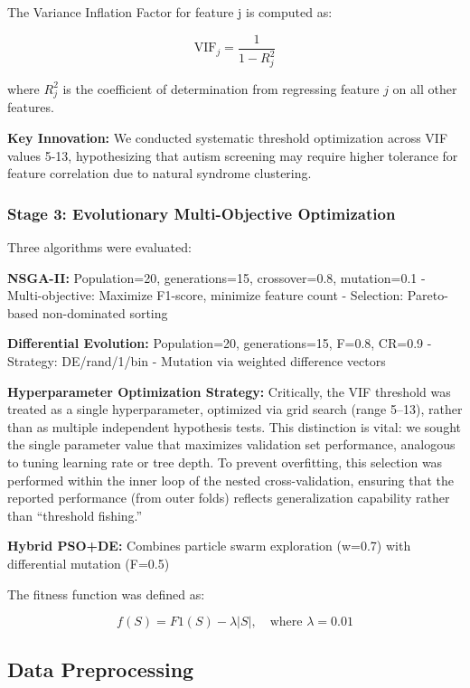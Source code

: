 The Variance Inflation Factor for feature j is computed as:

\[
\mathrm{VIF}_j = \frac{1}{1 - R_j^2}
\]

where \(R_j^2\) is the coefficient of determination from regressing feature \(j\) on all other features.

\textbf{Key Innovation:} We conducted systematic threshold optimization across VIF values 5-13, hypothesizing that autism screening may require higher tolerance for feature correlation due to natural syndrome clustering.

\subsubsection{Stage 3: Evolutionary Multi-Objective Optimization}\label{stage-3-evolutionary-multi-objective-optimization}

Three algorithms were evaluated:

\textbf{NSGA-II:} Population=20, generations=15, crossover=0.8, mutation=0.1 - Multi-objective: Maximize F1-score, minimize feature count - Selection: Pareto-based non-dominated sorting

\textbf{Differential Evolution:} Population=20, generations=15, F=0.8, CR=0.9 - Strategy: DE/rand/1/bin - Mutation via weighted difference vectors

\textbf{Hyperparameter Optimization Strategy:} Critically, the VIF threshold was treated as a single hyperparameter, optimized via grid search (range 5--13), rather than as multiple independent hypothesis tests. This distinction is vital: we sought the single parameter value that maximizes validation set performance, analogous to tuning learning rate or tree depth. To prevent overfitting, this selection was performed within the inner loop of the nested cross-validation, ensuring that the reported performance (from outer folds) reflects generalization capability rather than ``threshold fishing.''

\textbf{Hybrid PSO+DE:} Combines particle swarm exploration (w=0.7) with differential mutation (F=0.5)

The fitness function was defined as:

\[
f(S) = F1(S) - \lambda |S|, \quad \text{where } \lambda = 0.01
\]

\subsection{Data Preprocessing}\label{data-preprocessing}

